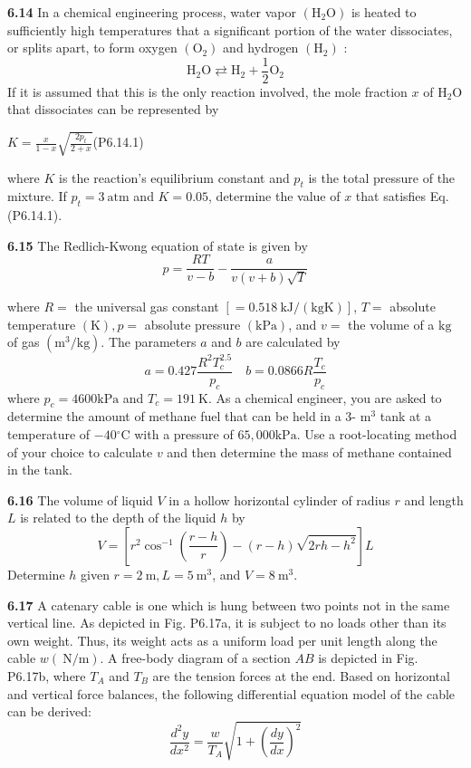 \documentclass[../main.tex]{subfiles}
\begin{document}
\begin{multicols}{2}
    \noindent \textbf{6.14} In a chemical engineering process, water vapor $\left(\mathrm{H}_{2} \mathrm{O}\right)$ is heated to sufficiently high temperatures that a significant portion of the water dissociates, or splits apart, to form oxygen $\left(\mathrm{O}_{2}\right)$ and hydrogen $\left(\mathrm{H}_{2}\right)$ :
    $$
    \mathrm{H}_{2} \mathrm{O} \rightleftarrows \mathrm{H}_{2}+\frac{1}{2} \mathrm{O}_{2}
    $$
    If it is assumed that this is the only reaction involved, the mole fraction $x$ of $\mathrm{H}_{2} \mathrm{O}$ that dissociates can be represented by
    
    $
    K=\frac{x}{1-x} \sqrt{\frac{2 p_{t}}{2+x}}   
    $\hfill{(P6.14.1)}

    where $K$ is the reaction's equilibrium constant and $p_{t}$ is the total pressure of the mixture. If $p_{t}=3 \mathrm{~atm}$ and $K=0.05$, determine the value of $x$ that satisfies Eq. (P6.14.1).

    \noindent \textbf{6.15} The Redlich-Kwong equation of state is given by
    $$
    p=\frac{R T}{v-b}-\frac{a}{v(v+b) \sqrt{T}}
    $$

    where $R=$ the universal gas constant $[=0.518 \mathrm{~kJ} /(\mathrm{kg} \mathrm{K})]$, $T=$ absolute temperature $(\mathrm{K}), p=$ absolute pressure $(\mathrm{kPa})$, and $v=$ the volume of a $\mathrm{kg}$ of gas $\left(\mathrm{m}^{3} / \mathrm{kg}\right)$. The parameters $a$ and $b$ are calculated by
    $$
    a=0.427 \frac{R^{2} T_{c}^{2.5}}{p_{c}} \quad b=0.0866 R \frac{T_{c}}{p_{c}}
    $$
    where $p_{c}=4600 \mathrm{kPa}$ and $T_{c}=191 \mathrm{~K}$. As a chemical engineer, you are asked to determine the amount of methane fuel that can be held in a 3- $\mathrm{m}^{3}$ tank at a temperature of $-40{ }^{\circ} \mathrm{C}$ with a pressure of $65,000 \mathrm{kPa}$. Use a root-locating method of your choice to calculate $v$ and then determine the mass of methane contained in the tank.
    
    \noindent \textbf{6.16}  The volume of liquid $V$ in a hollow horizontal cylinder of radius $r$ and length $L$ is related to the depth of the liquid $h$ by
    $$
    V=\left[r^{2} \cos ^{-1}\left(\frac{r-h}{r}\right)-(r-h) \sqrt{2 r h-h^{2}}\right] L
    $$
    Determine $h$ given $r=2 \mathrm{~m}, L=5 \mathrm{~m}^{3}$, and $V=8 \mathrm{~m}^{3}$. 
    
    \noindent\textbf{6.17}  A catenary cable is one which is hung between two points not in the same vertical line. As depicted in Fig. P6.17a, it is subject to no loads other than its own weight. Thus, its weight acts as a uniform load per unit length along the cable $w(\mathrm{~N} / \mathrm{m})$. A free-body diagram of a section $A B$ is depicted in Fig. P6.17b, where $T_{A}$ and $T_{B}$ are the tension forces at the end. Based on horizontal and vertical force balances, the following differential equation model of the cable can be derived:
    $$
    \frac{d^{2} y}{d x^{2}}=\frac{w}{T_{A}} \sqrt{1+\left(\frac{d y}{d x}\right)^{2}}
    $$


\end{multicols}
\end{document}
